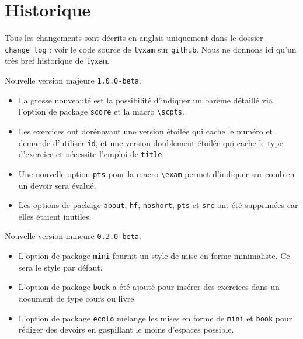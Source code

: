 \documentclass[12pt,a4paper]{scrartcl}
\begin{document}
\section{Historique}

Tous les changements sont décrits en anglais uniquement dans le dossier \verb+change_log+ : voir le code source de \verb+lyxam+ sur \verb+github+. Nous ne donnons ici qu'un très bref historique de \verb+lyxam+.

\medskip

\begin{description}[leftmargin=1em]
    \setlength\itemsep{1em}
    \item[2017-12-13] Nouvelle version majeure \verb+1.0.0-beta+.
        \begin{itemize}
            \item La grosse nouveauté est la possibilité d'indiquer un barème détaillé via l'option de package \verb+score+ et la macro \verb+\scpts+.

            \item Les exercices ont dorénavant une version étoilée qui cache le numéro et demande d'utiliser \verb+id+, et une version doublement étoilée qui cache le type d'exercice et nécessite l'emploi de \verb+title+.

            \item Une nouvelle option \verb+pts+ pour la macro \verb+\exam+ permet d'indiquer sur combien un devoir sera évalué.

            \item Les options de package \verb+about+, \verb+hf+, \verb+noshort+, \verb+pts+ et \verb+src+ ont été supprimées car elles étaient inutiles.
        \end{itemize}


    \item[2017-12-02] Nouvelle version mineure \verb+0.3.0-beta+.
    \begin{itemize}
        \item L'option de package \verb+mini+ fournit un style de mise en forme minimaliste. Ce sera le style par défaut.

        \item L'option de package \verb+book+ a été ajouté pour insérer des exercices dans un document de type cours ou livre.

        \item L'option de package \verb+ecolo+ mélange les mises en forme de \verb+mini+ et \verb+book+ pour rédiger des devoirs en gaspillant le moins d'espaces possible.
    \end{itemize}



\end{description}
\end{document}
